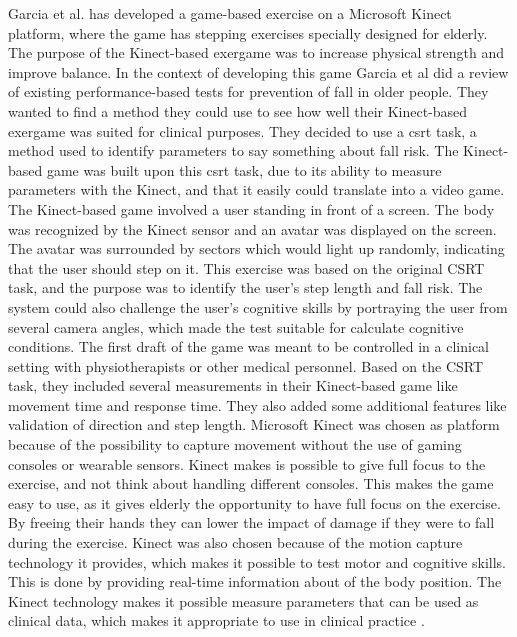 Garcia et al. \cite{garcia2012exergames} has developed a game-based exercise on a Microsoft Kinect platform, where the game has stepping exercises specially designed for elderly. The purpose of the Kinect-based exergame was to increase physical strength and improve balance. In the context of developing this game Garcia et al did a review of existing performance-based tests for prevention of fall in older people. They wanted to find a method they could use to see how well their Kinect-based exergame was suited for clinical purposes. They decided to use a \ac{csrt} task, a method used to identify parameters to say something about fall risk.  The Kinect-based game was built upon this \ac{csrt} task, due to its ability to measure parameters with the Kinect, and that it easily could translate into a video game. The Kinect-based game involved a user standing in front of a screen. The body was recognized by the Kinect sensor and an avatar was displayed on the screen.  The avatar was surrounded by sectors which would light up randomly, indicating that the user should step on it. This exercise was based on the original CSRT task, and the purpose was to identify the user’s step length and fall risk. The system could also challenge the user’s cognitive skills by portraying the user from several camera angles, which made the test suitable for calculate cognitive conditions.  The first draft of the game was meant to be controlled in a clinical setting with physiotherapists or other medical personnel. Based on the CSRT task, they included several measurements in their Kinect-based game like movement time and response time. They also added some additional features like validation of direction and step length.  Microsoft Kinect was chosen as platform because of the possibility to capture movement without the use of gaming consoles or wearable sensors. Kinect makes is possible to give full focus to the exercise, and not think about handling different consoles. This makes the game easy to use, as it gives elderly the opportunity to have full focus on the exercise. By freeing their hands they can lower the impact of damage if they were to fall during the exercise. Kinect was also chosen because of the motion capture technology it provides, which makes it possible to test motor and cognitive skills. This is done by providing real-time information about of the body position. The Kinect technology makes it possible measure parameters that can be used as clinical data, which makes it appropriate to use in clinical practice \cite{garcia2012exergames}.\\ \\
